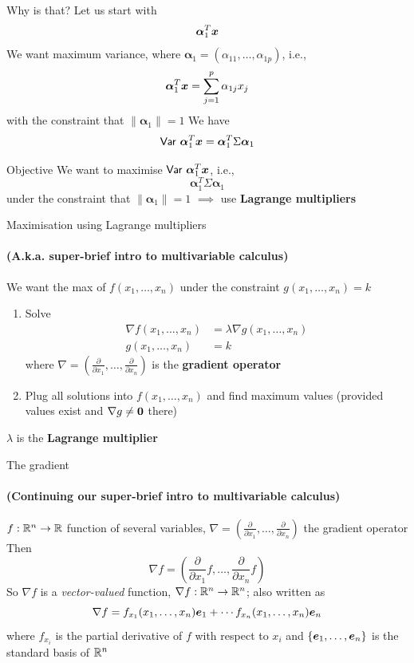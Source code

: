 \documentclass[aspectratio=169]{beamer}\usepackage[]{graphicx}\usepackage[]{xcolor}
\begin{document}
\begin{frame}{Why is that?}
Let us start with
\[
\bm{\alpha}_1^T\bm{x}
\]
\vfill
We want maximum variance, where $\bm{\alpha}_1=(\alpha_{11},\ldots,\alpha_{1p})$, i.e.,
\[
\bm{\alpha}_1^T\bm{x} = \sum_{j=1}^p\alpha_{1j}x_j
\]
with the constraint that $\|\bm{\alpha}_1\|=1$
\vfill
We have
\[
\mathsf{Var}\  \bm{\alpha}_1^T\bm{x}
=\bm{\alpha}_1^T\Sigma\bm{\alpha}_1
\]
\end{frame}

\begin{frame}{Objective}
We want to maximise $\mathsf{Var}\  \bm{\alpha}_1^T\bm{x}$, i.e.,
\[
\bm{\alpha}_1^T\Sigma\bm{\alpha}_1
\]
under the constraint that $\|\bm{\alpha}_1\|=1$
\vfill
$\implies$ use \textbf{Lagrange multipliers}
\end{frame}


\begin{frame}{Maximisation using Lagrange multipliers}
\framesubtitle{(A.k.a. super-brief intro to multivariable calculus)}
We want the max of $f(x_1,\ldots,x_n)$ under the constraint $g(x_1,\ldots,x_n)=k$
\begin{enumerate}
\item Solve
\begin{align*}
\nabla f(x_1,\ldots,x_n) &= \lambda\nabla g(x_1,\ldots,x_n) \\
g(x_1,\ldots,x_n) &= k
\end{align*}
where $\nabla=(\frac{\partial}{\partial x_1},\ldots,\frac{\partial}{\partial x_n})$ is the \textbf{gradient operator}
\item Plug all solutions into $f(x_1,\ldots,x_n)$ and find maximum values (provided values exist and $\nabla g\neq \b0$ there)
\end{enumerate}
\vfill
$\lambda$ is the \textbf{Lagrange multiplier}
\end{frame}


\begin{frame}{The gradient}
\framesubtitle{(Continuing our super-brief intro to multivariable calculus)}
$f:\mathbb{R}^n\to\mathbb{R}$ function of several variables, $\nabla=\left(\frac{\partial}{\partial x_1},\ldots,\frac{\partial}{\partial x_n}\right)$ the gradient operator
\vfill
Then
\[
\nabla f = \left(
\frac{\partial}{\partial x_1}f,\ldots,
\frac{\partial}{\partial x_n}f
\right)
\]
\vfill
So $\nabla f$ is a \emph{vector-valued} function, $\nabla f:\mathbb{R}^n\to\mathbb{R}^n$; also written as
\[
\nabla f = f_{x_1}(x_1,\ldots,x_n)\bm{e}_1+\cdots f_{x_n}(x_1,\ldots,x_n)\bm{e}_n
\]
where $f_{x_i}$ is the partial derivative of $f$ with respect to $x_i$ and $\{\bm{e}_1,\ldots,\bm{e}_n\}$ is the standard basis of $\mathbb{R}^n$
\end{frame}
\end{document}
